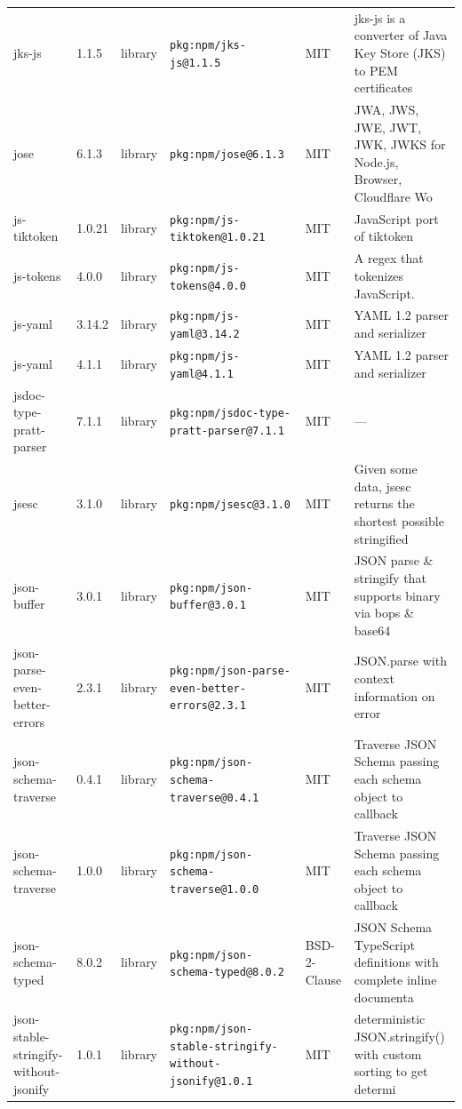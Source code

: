 \documentclass[11pt,a4paper]{article}
\begin{document}
\begin{longtable}{|p{4cm}|p{2cm}|p{1.6cm}|p{5cm}|p{1.5cm}|p{3.5cm}|}
\raggedright jks-js & 1.1.5 & library & \small\texttt{pkg:npm/jks-js@1.1.5} & MIT & \small jks-js is a converter of Java Key Store (JKS) to PEM certificates \\
\raggedright jose & 6.1.3 & library & \small\texttt{pkg:npm/jose@6.1.3} & MIT & \small JWA, JWS, JWE, JWT, JWK, JWKS for Node.js, Browser, Cloudflare Wo \\
\raggedright js-tiktoken & 1.0.21 & library & \small\texttt{pkg:npm/js-tiktoken@1.0.21} & MIT & \small JavaScript port of tiktoken \\
\raggedright js-tokens & 4.0.0 & library & \small\texttt{pkg:npm/js-tokens@4.0.0} & MIT & \small A regex that tokenizes JavaScript. \\
\raggedright js-yaml & 3.14.2 & library & \small\texttt{pkg:npm/js-yaml@3.14.2} & MIT & \small YAML 1.2 parser and serializer \\
\raggedright js-yaml & 4.1.1 & library & \small\texttt{pkg:npm/js-yaml@4.1.1} & MIT & \small YAML 1.2 parser and serializer \\
\raggedright jsdoc-type-pratt-parser & 7.1.1 & library & \small\texttt{pkg:npm/jsdoc-type-pratt-parser@7.1.1} & MIT & \small — \\
\raggedright jsesc & 3.1.0 & library & \small\texttt{pkg:npm/jsesc@3.1.0} & MIT & \small Given some data, jsesc returns the shortest possible stringified  \\
\raggedright json-buffer & 3.0.1 & library & \small\texttt{pkg:npm/json-buffer@3.0.1} & MIT & \small JSON parse \& stringify that supports binary via bops \& base64 \\
\raggedright json-parse-even-better-errors & 2.3.1 & library & \small\texttt{pkg:npm/json-parse-even-better-errors@2.3.1} & MIT & \small JSON.parse with context information on error \\
\raggedright json-schema-traverse & 0.4.1 & library & \small\texttt{pkg:npm/json-schema-traverse@0.4.1} & MIT & \small Traverse JSON Schema passing each schema object to callback \\
\raggedright json-schema-traverse & 1.0.0 & library & \small\texttt{pkg:npm/json-schema-traverse@1.0.0} & MIT & \small Traverse JSON Schema passing each schema object to callback \\
\raggedright json-schema-typed & 8.0.2 & library & \small\texttt{pkg:npm/json-schema-typed@8.0.2} & BSD-2-Clause & \small JSON Schema TypeScript definitions with complete inline documenta \\
\raggedright json-stable-stringify-without-jsonify & 1.0.1 & library & \small\texttt{pkg:npm/json-stable-stringify-without-jsonify@1.0.1} & MIT & \small deterministic JSON.stringify() with custom sorting to get determi \\

\end{longtable}
\end{document}

